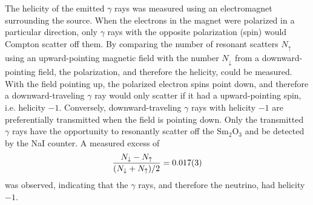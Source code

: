 The helicity of the emitted $\gamma$ rays was measured
using an electromagnet surrounding the  source.
When the electrons in the magnet were polarized in a particular direction,
only $\gamma$ rays with the opposite polarization (spin)
would Compton scatter off them.
By comparing the number of resonant scatters $N_\uparrow$
using an upward-pointing magnetic field
with the number $N_\downarrow$ from a downward-pointing field,
the polarization, and therefore the helicity, could be measured.
With the field pointing up, the polarized electron spins point down,
and therefore a downward-traveling $\gamma$ ray
would only scatter if it had a upward-pointing spin, i.e. helicity $-1$.
Conversely, downward-traveling $\gamma$ rays
with helicity $-1$ are preferentially transmitted
when the field is pointing down.
Only the transmitted $\gamma$ rays have the opportunity to
resonantly scatter off the $\text{Sm}_2\text{O}_3$
and be detected by the NaI counter.
A measured excess of
\begin{equation}\label{eq:helicity_meas}
    \frac{N_{\downarrow}-N_{\uparrow}}{(N_{\downarrow}+N_{\uparrow})/2} =
    \num{0.017\pm0.003}
\end{equation}
was observed,
indicating that the $\gamma$ rays, and therefore the neutrino,
had helicity $-1$.


